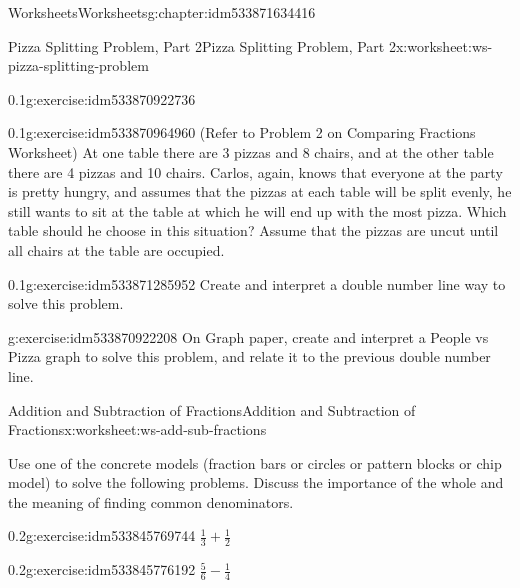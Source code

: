 \documentclass[twoside,11pt,]{book}
\begin{document}
\begin{chapterptx}{Worksheets}{}{Worksheets}{}{}{g:chapter:idm533871634416}
\begin{worksheet-section-numberless}{Pizza Splitting Problem, Part 2}{}{Pizza Splitting Problem, Part 2}{}{}{x:worksheet:ws-pizza-splitting-problem}
\begin{divisionexercise}{3}{}{0.1}{g:exercise:idm533870922736}
\begin{sidebyside}{1}{0.05}{0.05}{0}
\begin{sbspanel}{0.9}
\end{sbspanel}%
\end{sidebyside}%
\end{divisionexercise}%
\begin{divisionexercise}{4}{}{0.1}{g:exercise:idm533870964960}%
(Refer to Problem 2 on Comparing Fractions Worksheet) At one table there are 3 pizzas and 8 chairs, and at the other table there are 4 pizzas and 10 chairs.  Carlos, again, knows that everyone at the party is pretty hungry, and assumes that the pizzas at each table will be split evenly, he still wants to sit at the table at which he will end up with the most pizza.  Which table should he choose in this situation? Assume that the pizzas are uncut until all chairs at the table are occupied.%
\end{divisionexercise}%
\begin{divisionexercise}{5}{}{0.1}{g:exercise:idm533871285952}%
Create and interpret a double number line way to solve this problem.%
\end{divisionexercise}%
\begin{divisionexercise}{6}{}{}{g:exercise:idm533870922208}%
On Graph paper, create and interpret a People vs Pizza graph to solve this problem, and relate it to the previous double number line.%
\end{divisionexercise}%
\end{worksheet-section-numberless}
\restoregeometry
%
%
\typeout{************************************************}
\typeout{************************************************}
%
\begin{worksheet-section-numberless}{Addition and Subtraction of Fractions}{}{Addition and Subtraction of Fractions}{}{}{x:worksheet:ws-add-sub-fractions}
\begin{introduction}{}%
Use one of the concrete models (fraction bars or circles or pattern blocks or chip model) to solve the following problems. Discuss the importance of the whole and the meaning of finding common denominators.%
\end{introduction}%
\begin{divisionexercise}{1}{}{0.2}{g:exercise:idm533845769744}%
\(\frac{1}{3} + \frac{1}{2} \)%
\end{divisionexercise}%
\begin{divisionexercise}{2}{}{0.2}{g:exercise:idm533845776192}%
\(\frac{5}{6} - \frac{1}{4} \)%
\end{divisionexercise}%

\end{worksheet-section-numberless}
\end{chapterptx}
\end{document}
